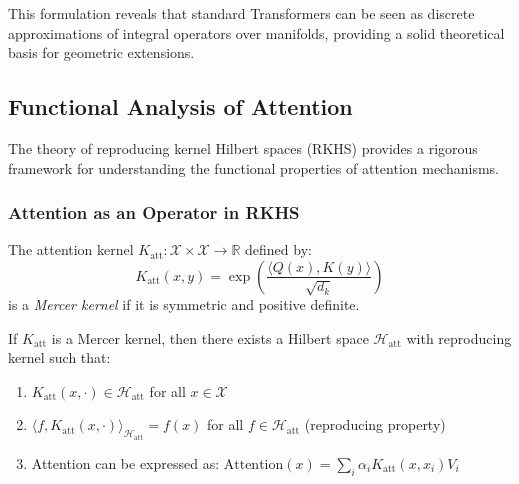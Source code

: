 This formulation reveals that standard \glspl{Transformer} can be seen as discrete approximations of integral operators over manifolds, providing a solid theoretical basis for geometric extensions.

\subsection{Functional Analysis of Attention}\label{subsec:functional_analysis_attention}

The theory of reproducing kernel Hilbert spaces (RKHS) provides a rigorous framework for understanding the functional properties of attention mechanisms.

\subsubsection{Attention as an Operator in RKHS}

\begin{definition}\label{def:attention_mercer_kernel}
    The attention kernel $K_{\text{att}}: \mathcal{X} \times \mathcal{X} \to \mathbb{R}$ defined by:
    \begin{equation}
        K_{\text{att}}(x, y) = \exp\left(\frac{\langle Q(x), K(y) \rangle}{\sqrt{d_k}}\right)
        \label{eq:attention_mercer_kernel}
    \end{equation}
    is a \textit{Mercer kernel} if it is symmetric and positive definite.
\end{definition}

\begin{theorem}\label{theorem:attention_rkhs}
    If $K_{\text{att}}$ is a Mercer kernel, then there exists a Hilbert space $\mathcal{H}_{\text{att}}$ with reproducing kernel such that:
    \begin{enumerate}
        \item $K_{\text{att}}(x, \cdot) \in \mathcal{H}_{\text{att}}$ for all $x \in \mathcal{X}$
        \item $\langle f, K_{\text{att}}(x, \cdot) \rangle_{\mathcal{H}_{\text{att}}} = f(x)$ for all $f \in \mathcal{H}_{\text{att}}$ (reproducing property)
        \item Attention can be expressed as: $\text{Attention}(x) = \sum_{i} \alpha_i K_{\text{att}}(x, x_i) V_i$
    \end{enumerate}
\end{theorem}

